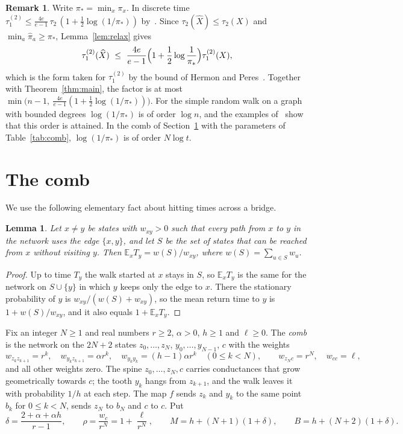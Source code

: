 \documentclass[11pt]{amsart}
\newtheorem{lemma}[theorem]{Lemma}
\theoremstyle{definition}
\newtheorem{remark}[theorem]{Remark}
\newcommand{\E}{\mathbb{E}}
\newcommand{\tmix}{\tau_1^{(2)}}
\newcommand{\hpi}{\widehat{\pi}}
\newcommand{\hX}{\widehat{X}}
\begin{document}
\begin{remark}\label{rem:pimin}
Write $\pi_*=\min_x\pi_x$. In discrete time $\tmix\le\frac{4e}{e-1}\,\tau_2\,(1+\frac12\log(1/\pi_*))$
by~\cite[Lemma~4.23]{AF}. Since $\tau_2(\hX)\le\tau_2(X)$ and $\min_a\hpi_a\ge\pi_*$, Lemma~\ref{lem:relax} gives
\[
\tmix(\hX)\ \le\ \frac{4e}{e-1}\Bigl(1+\frac12\log\frac1{\pi_*}\Bigr)\tmix(X),
\]
which is the form taken for $\tmix$ by the bound of Hermon and Peres~\cite[Remark~1.8]{HP}. Together with
Theorem~\ref{thm:main}, the factor is at most $\min\bigl(n-1,\ \frac{4e}{e-1}(1+\frac12\log(1/\pi_*))\bigr)$. For the
simple random walk on a graph with bounded degrees $\log(1/\pi_*)$ is of order $\log n$, and the examples
of~\cite{HP} show that this order is attained. In the comb of Section~\ref{sec:comb} with the parameters of
Table~\ref{tab:comb}, $\log(1/\pi_*)$ is of order $N\log t$.
\end{remark}

\section{The comb}\label{sec:comb}
We use the following elementary fact about hitting times across a bridge.

\begin{lemma}\label{lem:bridge}
Let $x\ne y$ be states with $w_{xy}>0$ such that every path from $x$ to $y$ in the network uses the edge $\{x,y\}$,
and let $S$ be the set of states that can be reached from $x$ without visiting $y$. Then
$\E_xT_y=w(S)/w_{xy}$, where $w(S)=\sum_{u\in S}w_u$.
\end{lemma}
\begin{proof}
Up to time $T_y$ the walk started at $x$ stays in $S$, so $\E_xT_y$ is the same for the network on $S\cup\{y\}$ in
which $y$ keeps only the edge to $x$. There the stationary probability of $y$ is $w_{xy}/(w(S)+w_{xy})$, so the mean
return time to $y$ is $1+w(S)/w_{xy}$, and it also equals $1+\E_xT_y$.
\end{proof}

Fix an integer $N\ge1$ and real numbers $r\ge2$, $\alpha>0$, $h\ge1$ and $\ell\ge0$. The \emph{comb} is the network
on the $2N+2$ states $z_0,\dots,z_N$, $y_0,\dots,y_{N-1}$, $c$ with the weights
\[
w_{z_kz_{k+1}}=r^k,\quad w_{y_kz_{k+1}}=\alpha r^k,\quad w_{y_ky_k}=(h-1)\alpha r^k\quad(0\le k<N),\qquad
w_{z_Nc}=r^N,\quad w_{cc}=\ell,
\]
and all other weights zero. The spine $z_0,\dots,z_N,c$ carries conductances that grow geometrically towards $c$; the
tooth $y_k$ hangs from $z_{k+1}$, and the walk leaves it with probability $1/h$ at each step. The map $f$ sends $z_k$
and $y_k$ to the same point $b_k$ for $0\le k<N$, sends $z_N$ to $b_N$ and $c$ to $c$. Put
\[
\delta=\frac{2+\alpha+\alpha h}{r-1},\qquad \rho=\frac{w_c}{r^N}=1+\frac{\ell}{r^N},\qquad
M=h+(N+1)(1+\delta),\qquad B=h+(N+2)(1+\delta).
\]
\end{document}
